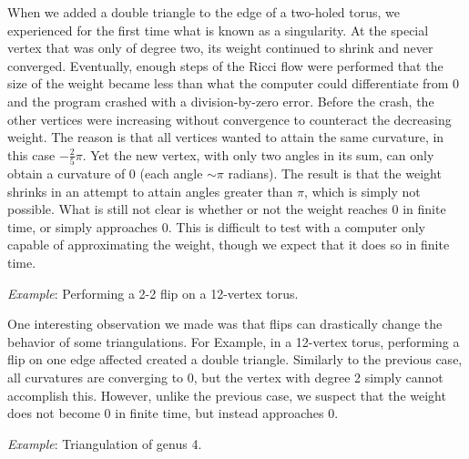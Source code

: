 \documentclass[12pt]{article}
\begin{document}
\noindent When we added a double triangle to the edge of a two-holed torus, we experienced for the first time what is known as a singularity. At the special vertex that was only of degree two, its weight continued to shrink and never converged. Eventually, enough steps of the Ricci flow were performed that the size of the weight became less than what the computer could differentiate from 0 and the program crashed with a division-by-zero error. Before the crash, the other vertices were increasing without convergence to counteract the decreasing weight. The reason is that all vertices wanted to attain the same curvature, in this case $-\frac{2}{5}\pi$. Yet the new vertex, with only two angles in its sum, can only obtain a curvature of 0 (each angle $\sim\pi$ radians). The result is that the weight shrinks in an attempt to attain angles greater than $\pi$, which is simply not possible. What is still not clear is whether or not the weight reaches 0 in finite time, or simply approaches 0. This is difficult to test with a computer only capable of approximating the weight, though we expect that it does so in finite time.\newline

\noindent \textit{Example}: Performing a 2-2 flip on a 12-vertex torus. \newline

\noindent One interesting observation we made was that flips can drastically change the behavior of some triangulations. For Example, in a 12-vertex torus, performing a flip on one edge affected created a double triangle. Similarly to the previous case, all curvatures are converging to 0, but the vertex with degree 2 simply cannot accomplish this. However, unlike the previous case, we suspect that the weight does not become 0 in finite time, but instead approaches 0.\newline

\noindent \textit{Example}: Triangulation of genus 4.\newline
\end{document}
